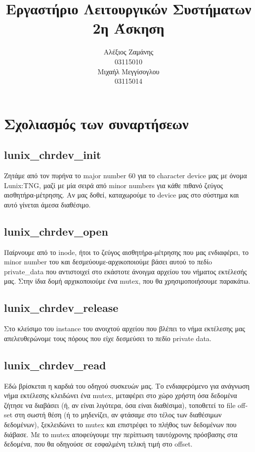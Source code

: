 \documentclass[12pt,titlepage]{article}
\title{Εργαστήριο Λειτουργικών Συστήματων\\
2η Άσκηση}
\author{Αλέξιος Ζαμάνης\\
03115010\\
Μιχαήλ Μεγγίσογλου\\
03115014}
\begin{document}
\maketitle

\section{Σχολιασμός των συναρτήσεων}

\subsection{\textlatin{lunix\_chrdev\_init}}

Ζητάμε από τον πυρήνα το \textlatin{major number} 60 για το \textlatin{character device} μας με όνομα \textlatin{Lunix:TNG}, μαζί με μία σειρά από \textlatin{minor numbers} για κάθε πιθανό ζεύγος αισθητήρα-μέτρησης. Αν μας δοθεί, καταχωρούμε το \textlatin{device} μας στο σύστημα και αυτό γίνεται άμεσα διαθέσιμο.

\subsection{\textlatin{lunix\_chrdev\_open}}

Παίρνουμε από το \textlatin{inode}, ήτοι το ζεύγος αισθητήρα-μέτρησης που μας ενδιαφέρει, το \textlatin{minor number} του και δεσμεύουμε-αρχικοποιούμε βάσει αυτού το πεδίo \textlatin{private\_data} που αντιστοιχεί στο εκάστοτε άνοιγμα αρχείου του νήματος εκτέλεσής μας. Στην ίδια δομή αρχικοποιούμε ένα \textlatin{mutex}, που θα χρησιμοποιήσουμε παρακάτω.

\subsection{\textlatin{lunix\_chrdev\_release}}

Στο κλείσιμο του \textlatin{instance} του ανοιχτού αρχείου που βλέπει το νήμα εκτέλεσης μας απελευθερώνομε τους πόρους που είχε δεσμεύσει το πεδίο \textlatin{private data}.

\subsection{\textlatin{lunix\_chrdev\_read}}

Εδώ βρίσκεται η καρδιά του οδηγού συσκευών μας. Το ενδιαφερόμενο για ανάγνωση νήμα εκτέλεσης κλειδώνει ένα \textlatin{mutex}, μεταφέρει στο χώρο χρήστη όσα δεδομένα ζήτησε να διαβάσει (ή, αν είναι λιγότερα, όσα είναι διαθέσιμα), τοποθετεί το \textlatin{file offset} στη σωστή θέση (ή το μηδενίζει, αν φτάσαμε στο τέλος των διαθέσιμων δεδομένων), ξεκλειδώνει το \textlatin{mutex} και επιστρέφει το πλήθος των δεδομένων που διάβασε. Με το \textlatin{mutex} αποφεύγουμε την περίπτωση ταυτόχρονης πρόσβασης στα δεδομένα, που θα οδηγούσε σε εσφαλμένη τελική τιμή στο \textlatin{offset}.
\end{document}
